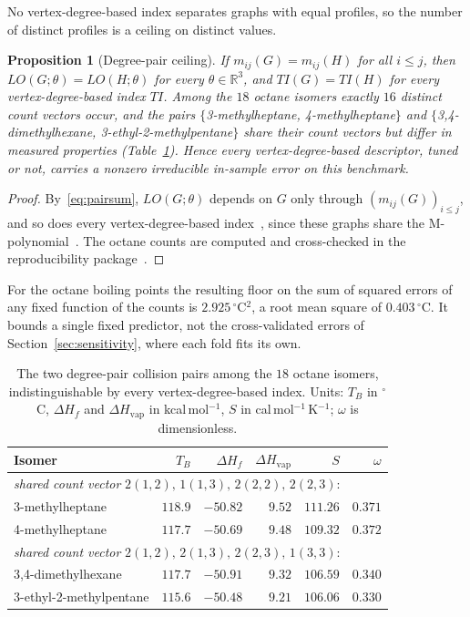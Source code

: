 \documentclass[a5paper, 10pt]{article}
\theoremstyle{plain}
\newtheorem{proposition}[theorem]{Proposition}
\theoremstyle{remark}
\theoremstyle{definition}
\begin{document}
No vertex-degree-based index separates graphs with equal profiles, so the
number of distinct profiles is a ceiling on distinct values.

  \begin{proposition}[Degree-pair ceiling]\label{prop:collision}
  If $m_{ij}(G) = m_{ij}(H)$ for all $i \le j$, then
  $LO(G;\theta) = LO(H;\theta)$ for every $\theta \in \mathbb{R}^3$, and
  $TI(G) = TI(H)$ for every vertex-degree-based index $TI$. Among the
  $18$ octane isomers exactly $16$ distinct count vectors occur, and the
  pairs $\{$3-methylheptane, 4-methylheptane$\}$ and
  $\{$3,4-dimethylhexane, 3-ethyl-2-methylpentane$\}$ share their
  count vectors but differ in measured properties
  (Table~\ref{tab:collisions}). Hence every vertex-degree-based
  descriptor, tuned or not, carries a nonzero irreducible in-sample error on this benchmark.
  \end{proposition}

  \begin{proof}
  By~\eqref{eq:pairsum}, $LO(G;\theta)$ depends on $G$ only through
  $(m_{ij}(G))_{i \le j}$, and so does every vertex-degree-based
  index~\cite{Rada2026LinearVDB}, since these graphs share the
  M-polynomial~\cite{DeutschKlavzar2015}. The octane counts are computed
  and cross-checked in the reproducibility package~\cite{LoyolaRepo}.
  \end{proof}

For the octane boiling points the resulting floor on the sum of squared
errors of any fixed function of the counts is $2.925\,^{\circ}$C$^2$, a
root mean square of $0.403\,^{\circ}$C. It bounds a single fixed
predictor, not the cross-validated errors of Section~\ref{sec:sensitivity},
where each fold fits its own.

\begin{table}[htbp]
\centering
\caption{The two degree-pair collision pairs among the $18$ octane
isomers, indistinguishable by every vertex-degree-based index. Units:
$T_B$ in $^{\circ}$C, $\Delta H_f$ and $\Delta H_{\mathrm{vap}}$ in
kcal\,mol$^{-1}$, $S$ in cal\,mol$^{-1}$\,K$^{-1}$; $\omega$ is
dimensionless.}
\label{tab:collisions}
\small
\begin{tabular}{lrrrrr}
\toprule
Isomer & $T_B$ & $\Delta H_f$ & $\Delta H_{\mathrm{vap}}$ & $S$ & $\omega$\\
\midrule
\multicolumn{6}{l}{\emph{shared count vector} $2(1,2),\,1(1,3),\,2(2,2),\,2(2,3)$:}\\
3-methylheptane & $118.9$ & $-50.82$ & $9.52$ & $111.26$ & $0.371$\\
4-methylheptane & $117.7$ & $-50.69$ & $9.48$ & $109.32$ & $0.372$\\
\midrule
\multicolumn{6}{l}{\emph{shared count vector} $2(1,2),\,2(1,3),\,2(2,3),\,1(3,3)$:}\\
3,4-dimethylhexane & $117.7$ & $-50.91$ & $9.32$ & $106.59$ & $0.340$\\
3-ethyl-2-methylpentane & $115.6$ & $-50.48$ & $9.21$ & $106.06$ & $0.330$\\
\bottomrule
\end{tabular}
\end{table}
\end{document}
